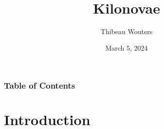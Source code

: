 \documentclass[usenames,dvipsnames,t]{beamer}
\title[QCD JC] %
{Kilonovae}
\author{Thibeau Wouters}
\date{March 5, 2024}
\begin{document}






\begin{frame}[plain]
\titlepage
\end{frame}






\begin{frame}
\frametitle{Table of Contents}
\tableofcontents
\end{frame}


\section{Introduction}
\end{document}
